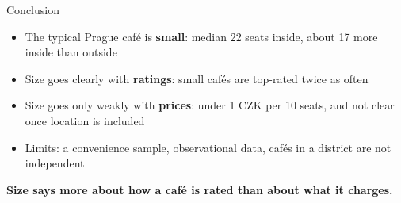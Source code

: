 \documentclass[aspectratio=169,11pt]{beamer}
\begin{document}
\begin{frame}{Conclusion}
\begin{itemize}\setlength{\itemsep}{8pt}
  \item The typical Prague café is \textbf{small}: median 22 seats inside, about 17 more inside than outside
  \item Size goes clearly with \textbf{ratings}: small cafés are top-rated twice as often
  \item Size goes only weakly with \textbf{prices}: under 1 CZK per 10 seats, and not clear once location is included
  \item Limits: a convenience sample, observational data, cafés in a district are not independent
\end{itemize}
\vspace{10pt}
\centering\large\textbf{Size says more about how a café is rated than about what it charges.}
\end{frame}
\end{document}
